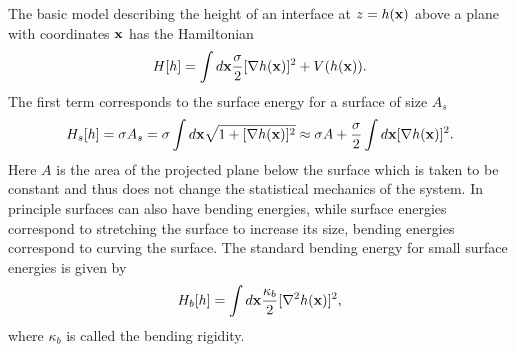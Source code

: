 The basic model describing the height of an interface at $z=h({\bf x})$ above a plane with coordinates ${\bf x}$ has the Hamiltonian 
\begin{equation}
    H[h] = \int d{\bf x}\frac{\sigma}{2} [\nabla h({\bf x})]^2 + V(h({\bf x})).
\end{equation}
The first term corresponds to the surface energy for a surface of size $A_s$ 
\begin{equation}
    H_s[h] = \sigma A_s =\sigma\int d{\bf x} \sqrt{1+[\nabla h({\bf x})]^2}\approx \sigma A + \frac{\sigma}{2}\int d{\bf x} [\nabla h({\bf x})]^2 .
\end{equation}
Here $A$ is the area of the projected plane below the surface which is taken to be constant and thus does not change the statistical mechanics of the system. In principle surfaces can also have bending energies, while surface energies correspond to stretching the surface to increase its size, bending energies correspond to curving the surface. The standard bending energy for small surface energies is given by
\begin{equation}
    H_b[h] = \int d{\bf x} \frac{\kappa_b}{2}[\nabla^2 h({\bf x})]^2,
\end{equation} 
where $\kappa_b$ is called the bending rigidity.

